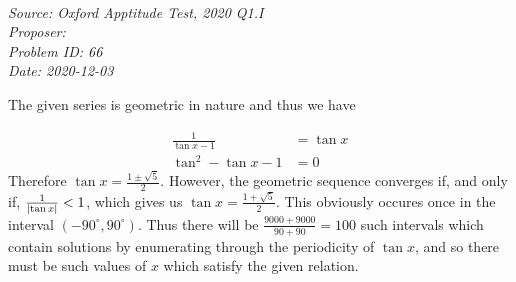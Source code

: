 \SSbreak\\
\emph{Source: Oxford Apptitude Test, 2020 Q1.I}\\
\emph{Proposer: \Pss}\\
\emph{Problem ID: 66}\\
\emph{Date: 2020-12-03}\\
\SSbreak

\bigskip

\begin{solution}\hfil\medskip

  The given series is geometric in nature and thus we have 
  
  \begin{align*}
    \frac{1}{\tan x-1}&=\tan x\\
    \tan^2-\tan x-1&=0
  \end{align*}
  Therefore \(\tan x =\frac{1\pm \sqrt{5}}{2}\). However, the geometric sequence converges if, and only if, \(\frac{1}{\left\lvert \tan x\right\rvert}<1\), which gives us \(\tan x=\frac{1+\sqrt{5}}{2}\). This obviously occures once in the interval \((-90^{\circ},90^{\circ})\). Thus there will be \(\frac{9000+9000}{90+90}=100\) such intervals which contain solutions by enumerating through the periodicity of \(\tan x\), and so there must be  such values of \(x\) which satisfy the given relation. 
\end{solution}\bigskip
